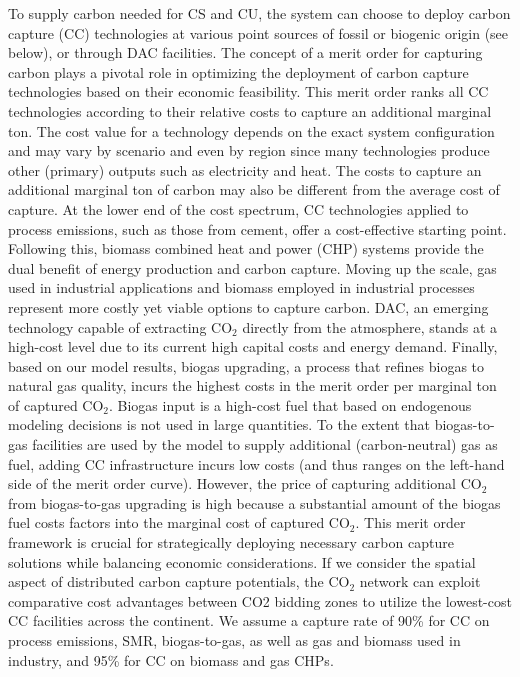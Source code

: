 \documentclass[twocolumn]{article}
\newcommand{\carbon}{CO$_2$}
\begin{document}
To supply carbon needed for CS and CU, the system can choose to deploy carbon capture (CC) technologies at various point sources of fossil or biogenic origin (see below), or through DAC facilities.
The concept of a merit order for capturing carbon plays a pivotal role in optimizing the deployment of carbon capture technologies based on their economic feasibility.
This merit order ranks all CC technologies according to their relative costs to capture an additional marginal ton. The cost value for a technology depends on the exact system configuration and may vary by scenario and even by region since many technologies produce other (primary) outputs such as electricity and heat. The costs to capture an additional marginal ton of carbon may also be different from the average cost of capture.
At the lower end of the cost spectrum, CC technologies applied to process emissions, such as those from cement, offer a cost-effective starting point.
Following this, biomass combined heat and power (CHP) systems provide the dual benefit of energy production and carbon capture.
Moving up the scale, gas used in industrial applications and biomass employed in industrial processes represent more costly yet viable options to capture carbon.
DAC, an emerging technology capable of extracting \carbon{} directly from the atmosphere, stands at a high-cost level due to its current high capital costs and energy demand.
Finally, based on our model results, biogas upgrading, a process that refines biogas to natural gas quality, incurs the highest costs in the merit order per marginal ton of captured \carbon{}.
Biogas input is a high-cost fuel that based on endogenous modeling decisions is not used in large quantities.
To the extent that biogas-to-gas facilities are used by the model to supply additional (carbon-neutral) gas as fuel, adding CC infrastructure incurs low costs (and thus ranges on the left-hand side of the merit order curve).
However, the price of capturing additional \carbon{} from biogas-to-gas upgrading is high because a substantial amount of the biogas fuel costs factors into the marginal cost of captured \carbon{}.
This merit order framework is crucial for strategically deploying necessary carbon capture solutions while balancing economic considerations.
If we consider the spatial aspect of distributed carbon capture potentials, the \carbon{} network can exploit comparative cost advantages between CO2 bidding zones to utilize the lowest-cost CC facilities across the continent.
We assume a capture rate of 90\% for CC on process emissions, SMR, biogas-to-gas, as well as gas and biomass used in industry, and 95\% for CC on biomass and gas CHPs.
\end{document}
